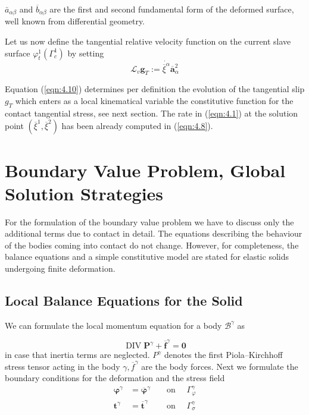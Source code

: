 $\bar{a}_{\alpha \beta}$ and $\overline{b}_{\alpha \beta}$  are the ﬁrst and second fundamental form of the deformed surface, well known
from diﬀerential geometry.

Let us now deﬁne the tangential relative velocity function on the current slave surface $\varphi^1_t(\Gamma_c^1)$ by setting
\begin{equation}
 \mathcal{L}_{v} \mathbf{g}_{T}:={\dot{\overline{\xi}^{\alpha}}} \overline{\mathbf{a}}_{\alpha}^{2} 
 \label{eqn:4.10} 
\end{equation}

Equation (\ref{eqn:4.10}) determines per deﬁnition the evolution of the tangential slip $g_T$ which
enters as a local kinematical variable the constitutive function for the contact tangential
stress, see next section. The rate \dot{\overline{\xi}^{\alpha}} in (\ref{eqn:4.1}) at the solution point $( \overline{\xi}^ 1 , \overline{\xi}^ 2 )$ has been already
computed in (\ref{eqn:4.8}).
\section{Boundary Value Problem, Global Solution Strategies}
For the formulation of the boundary value problem we have to discuss only the additional
terms due to contact in detail. The equations describing the behaviour of the bodies coming
into contact do not change. However, for completeness, the balance equations and a simple
constitutive model are stated for elastic solids undergoing ﬁnite deformation.
\subsection{Local Balance Equations for the Solid}
We can formulate the local momentum equation for a body $\mathcal{B}^\gamma$ as

\begin{equation}
 \operatorname{DIV} \mathbf{P}^{\gamma}+\overline{\mathbf{f}}^{\gamma}=\mathbf{0} 
 \label{eqn:4.24} 
\end{equation}
in case that inertia terms are neglected. $P^\gamma$ denotes the ﬁrst Piola–Kirchhoﬀ stress tensor acting in the body $\gamma,\overline{f}^\gamma$ are the body forces. Next we formulate the boundary conditions
for the deformation and the stress ﬁeld
\begin{equation}
 \begin{aligned} \boldsymbol{\varphi}^{\gamma} &=\overline{\boldsymbol{\varphi}}^{\gamma} & & \text { on } \quad \Gamma_{\varphi}^{\gamma} \\ \mathbf{t}^{\gamma} &=\overline{\mathbf{t}}^{\gamma} & & \text { on } \quad \Gamma_{\sigma}^{\gamma} \end{aligned} 
 \label{eqn:4.25} 
\end{equation}

